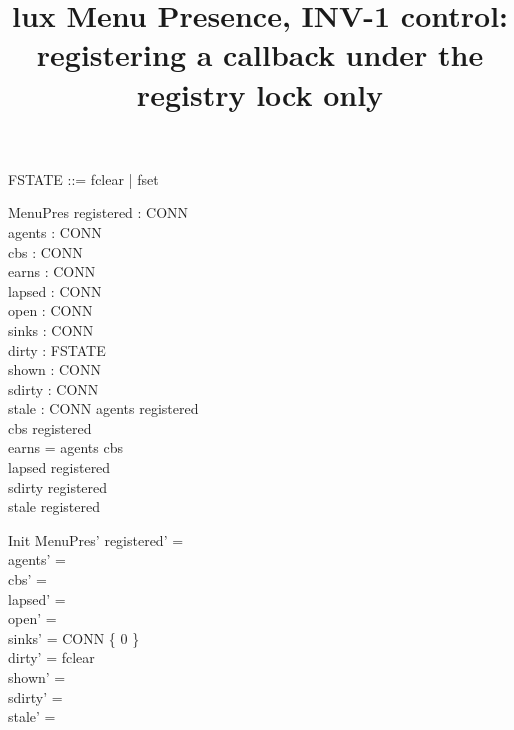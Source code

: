 \documentclass[a4paper,10pt,fleqn]{article}
\begin{document}
\title{lux Menu Presence, INV-1 control: registering a callback under the registry lock only}
\maketitle

\begin{zed}
  [CONN]
\end{zed}

\begin{zed}
  FSTATE ::= fclear | fset
\end{zed}

\begin{schema}{MenuPres}
  registered : \power CONN \\
  agents : \power CONN \\
  cbs : \power CONN \\
  earns : \power CONN \\
  lapsed : \power CONN \\
  open : \power CONN \\
  sinks : CONN   \\
  dirty : FSTATE \\
  shown : \power CONN \\
  sdirty : \power CONN \\
  stale : \power CONN
\where
  agents \subseteq registered \\
  cbs \subseteq registered \\
  earns = agents \cup cbs \\
  lapsed \subseteq registered \\
  sdirty \subseteq registered \\
  stale \subseteq registered
\end{schema}

\begin{schema}{Init}
  MenuPres'
\where
  registered' = \emptyset \\
  agents' = \emptyset \\
  cbs' = \emptyset \\
  lapsed' = \emptyset \\
  open' = \emptyset \\
  sinks' = CONN \cross \{ 0 \} \\
  dirty' = fclear \\
  shown' = \emptyset \\
  sdirty' = \emptyset \\
  stale' = \emptyset
\end{schema}
\end{document}
